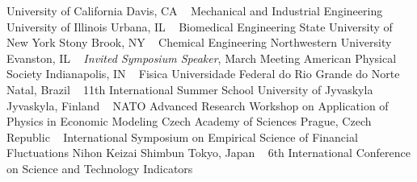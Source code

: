    University of California
    \newline
Davis, CA
\newline
~
\Gap
{}
Mechanical and Industrial Engineering
\newline
    University of Illinois
    \newline
Urbana, IL
\newline
~
\Gap
{}
Biomedical Engineering
\newline
    State University of New York
    \newline
Stony Brook, NY
\newline
~
\Gap
{}
Chemical Engineering
\newline
    Northwestern University
    \newline
Evanston, IL
\newline
~
\Gap
{}
\textit{Invited Symposium Speaker}, March Meeting
\newline
    American Physical Society 
    \newline
Indianapolis, IN
\newline
~
\Gap
{}
Fisica
\newline
    Universidade Federal do Rio Grande do Norte
    \newline
Natal, Brazil
\newline
~
\Gap
{}
11th International Summer School
\newline
    University of Jyvaskyla
    \newline
Jyvaskyla, Finland
\newline
~
\Gap
{}
NATO Advanced Research Workshop on Application of Physics in Economic Modeling
\newline
    Czech Academy of Sciences
    \newline
Prague, Czech Republic
\newline
~
\Gap
{}
International Symposium on Empirical Science of Financial Fluctuations 
\newline
    Nihon Keizai Shimbun
    \newline
Tokyo, Japan
\newline
~
\Gap
{}
6th International Conference on Science and Technology Indicators
\newline
